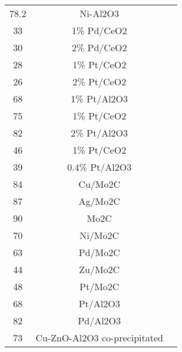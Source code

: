 \begin{center}
\begin{longtable}{ccc}
78.2                 & Ni-Al2O3                                & \cite{Li_2000}         \\
33                   & 1\% Pd/CeO2                             & \cite{Deshpande_2010}         \\
30                   & 2\% Pd/CeO2                             & \cite{Deshpande_2010}         \\
28                   & 1\% Pt/CeO2                             & \cite{Deshpande_2010}         \\
26                   & 2\% Pt/CeO2                             & \cite{Deshpande_2010}         \\
68                   & 1\% Pt/Al2O3                            & \cite{Phatak_2007}         \\
75                   & 1\% Pt/CeO2                             & \cite{Phatak_2007}         \\
82                   & 2\% Pt/Al2O3                            & \cite{Phatak_2007}         \\
46                   & 1\% Pt/CeO2                             & \cite{Phatak_2007}         \\
39                   & 0.4\% Pt/Al2O3                          & \cite{Phatak_2007}         \\
84                   & Cu/Mo2C                                 & \cite{Sabnis_2015}         \\
87                   & Ag/Mo2C                                 & \cite{Sabnis_2015}         \\
90                   & Mo2C                                    & \cite{Sabnis_2015}         \\
70                   & Ni/Mo2C                                 & \cite{Sabnis_2015}         \\
63                   & Pd/Mo2C                                 & \cite{Sabnis_2015}         \\
44                   & Zu/Mo2C                                 & \cite{Sabnis_2015}         \\
48                   & Pt/Mo2C                                 & \cite{Sabnis_2015}         \\
68                   & Pt/Al2O3                                & \cite{Clay_2014}         \\
82                   & Pd/Al2O3                                & \cite{Clay_2014}         \\
73                   & Cu-ZnO-Al2O3 co-precipitated            & \cite{Madon_2011}         \\

\end{longtable}
\end{center}
